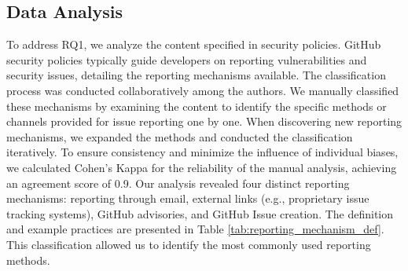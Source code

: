 

\subsection{Data Analysis}
To address RQ1, we analyze the content specified in security policies. GitHub security policies typically guide developers on reporting vulnerabilities and security issues, detailing the reporting mechanisms available. The classification process was conducted collaboratively among the authors. We manually classified these mechanisms by examining the content to identify the specific methods or channels provided for issue reporting one by one. When discovering new reporting mechanisms, we expanded the methods and conducted the classification iteratively. To ensure consistency and minimize the influence of individual biases, we calculated Cohen’s Kappa \cite{jacob_cohen:1960} for the reliability of the manual analysis, achieving an agreement score of 0.9. Our analysis revealed four distinct reporting mechanisms: reporting through email, external links (e.g., proprietary issue tracking systems), GitHub advisories, and GitHub Issue creation. The definition and example practices are presented in Table \ref{tab:reporting_mechanism_def}. This classification allowed us to identify the most commonly used reporting methods.

